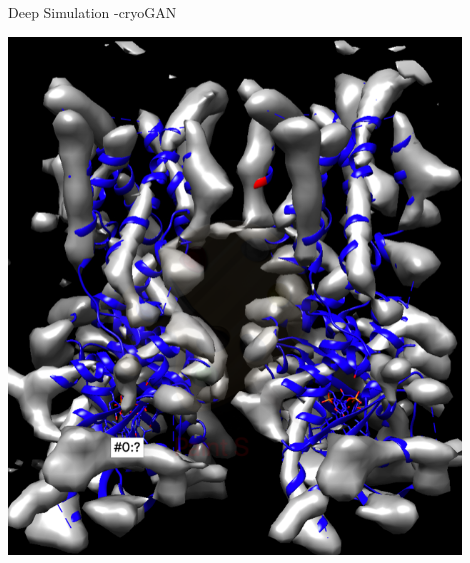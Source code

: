 \begin{minipage}{0.209\textwidth}
{\Large Deep Simulation -cryoGAN}
        \begin{tikzfigure}
           \includegraphics[width=0.9\textwidth]{gen_map.png}
        \end{tikzfigure}
\end{minipage}